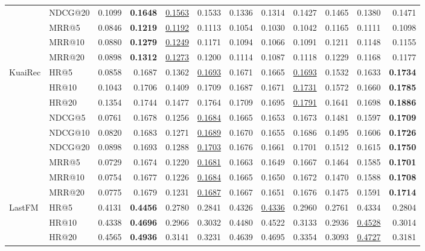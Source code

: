 \begin{tabular}{llrrrrrrrrrr}
 & NDCG@20 & 0.1099 & \textbf{0.1648} & \underline{0.1563} & 0.1533 & 0.1336 & 0.1314 & 0.1427 & 0.1465 & 0.1380 & 0.1471 \\
 & MRR@5 & 0.0846 & \textbf{0.1219} & \underline{0.1192} & 0.1113 & 0.1054 & 0.1030 & 0.1042 & 0.1165 & 0.1111 & 0.1098 \\
 & MRR@10 & 0.0880 & \textbf{0.1279} & \underline{0.1249} & 0.1171 & 0.1094 & 0.1066 & 0.1091 & 0.1211 & 0.1148 & 0.1155 \\
 & MRR@20 & 0.0898 & \textbf{0.1312} & \underline{0.1273} & 0.1200 & 0.1114 & 0.1087 & 0.1118 & 0.1229 & 0.1168 & 0.1177 \\
\hline
KuaiRec & HR@5 & 0.0858 & 0.1687 & 0.1362 & \underline{0.1693} & 0.1671 & 0.1665 & \underline{0.1693} & 0.1532 & 0.1633 & \textbf{0.1734} \\
 & HR@10 & 0.1043 & 0.1706 & 0.1409 & 0.1709 & 0.1687 & 0.1671 & \underline{0.1731} & 0.1572 & 0.1660 & \textbf{0.1785} \\
 & HR@20 & 0.1354 & 0.1744 & 0.1477 & 0.1764 & 0.1709 & 0.1695 & \underline{0.1791} & 0.1641 & 0.1698 & \textbf{0.1886} \\
 & NDCG@5 & 0.0761 & 0.1678 & 0.1256 & \underline{0.1684} & 0.1665 & 0.1653 & 0.1673 & 0.1481 & 0.1597 & \textbf{0.1709} \\
 & NDCG@10 & 0.0820 & 0.1683 & 0.1271 & \underline{0.1689} & 0.1670 & 0.1655 & 0.1686 & 0.1495 & 0.1606 & \textbf{0.1726} \\
 & NDCG@20 & 0.0898 & 0.1693 & 0.1288 & \underline{0.1703} & 0.1676 & 0.1661 & 0.1701 & 0.1512 & 0.1615 & \textbf{0.1750} \\
 & MRR@5 & 0.0729 & 0.1674 & 0.1220 & \underline{0.1681} & 0.1663 & 0.1649 & 0.1667 & 0.1464 & 0.1585 & \textbf{0.1701} \\
 & MRR@10 & 0.0754 & 0.1677 & 0.1226 & \underline{0.1684} & 0.1665 & 0.1650 & 0.1672 & 0.1470 & 0.1588 & \textbf{0.1708} \\
 & MRR@20 & 0.0775 & 0.1679 & 0.1231 & \underline{0.1687} & 0.1667 & 0.1651 & 0.1676 & 0.1475 & 0.1591 & \textbf{0.1714} \\
\hline
LastFM & HR@5 & 0.4131 & \textbf{0.4456} & 0.2780 & 0.2841 & 0.4326 & \underline{0.4336} & 0.2960 & 0.2761 & 0.4334 & 0.2804 \\
 & HR@10 & 0.4338 & \textbf{0.4696} & 0.2966 & 0.3032 & 0.4480 & 0.4522 & 0.3133 & 0.2936 & \underline{0.4528} & 0.3014 \\
 & HR@20 & 0.4565 & \textbf{0.4936} & 0.3141 & 0.3231 & 0.4639 & 0.4695 & 0.3354 & 0.3093 & \underline{0.4727} & 0.3181 \\

\end{tabular}
